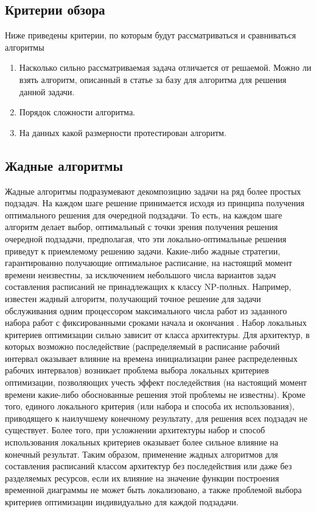 \subsection{Критерии обзора}
Ниже приведены критерии, по которым будут рассматриваться и сравниваться алгоритмы
\begin{enumerate}
    \item Насколько сильно рассматриваемая задача отличается от решаемой. Можно ли взять алгоритм, описанный в статье за базу для алгоритма для решения данной задачи.
    \item Порядок сложности алгоритма.
    \item На данных какой размерности протестирован алгоритм.
\end{enumerate}
\subsection{Жадные алгоритмы}
Жадные алгоритмы подразумевают декомпозицию задачи на ряд более простых подзадач. На каждом шаге решение принимается исходя из принципа получения оптимального решения для очередной подзадачи. То есть, на каждом шаге алгоритм делает выбор, оптимальный с точки зрения получения решения очередной подзадачи, предполагая, что эти локально-оптимальные решения приведут к приемлемому решению задачи. Какие-либо жадные стратегии, гарантированно получающие оптимальное расписание, на настоящий момент времени неизвестны, за исключением небольшого числа вариантов задач составления расписаний не принадлежащих к классу NP-полных. Например, известен жадный алгоритм, получающий точное решение для задачи обслуживания одним процессором максимального числа работ из заданного набора работ с фиксированными сроками начала и окончания \cite{Cormen}. Набор локальных критериев оптимизации сильно зависит от класса архитектуры. Для архитектур, в которых возможно последействие (распределяемый в расписание рабочий интервал оказывает влияние на времена инициализации ранее распределенных рабочих интервалов) возникает проблема выбора локальных критериев оптимизации, позволяющих учесть эффект последействия (на настоящий момент времени какие-либо обоснованные решения этой проблемы не известны). Кроме того, единого локального критерия (или набора и способа их использования), приводящего к наилучшему конечному результату, для решения всех подзадач не существует. Более того, при усложнении архитектуры набор и способ использования локальных критериев оказывает более сильное влияние на конечный результат. Таким образом, применение жадных алгоритмов для составления расписаний классом архитектур без последействия или даже без разделяемых ресурсов, если их влияние на значение функции построения временной диаграммы не может быть локализовано, а также проблемой выбора критериев оптимизации индивидуально для каждой подзадачи.

